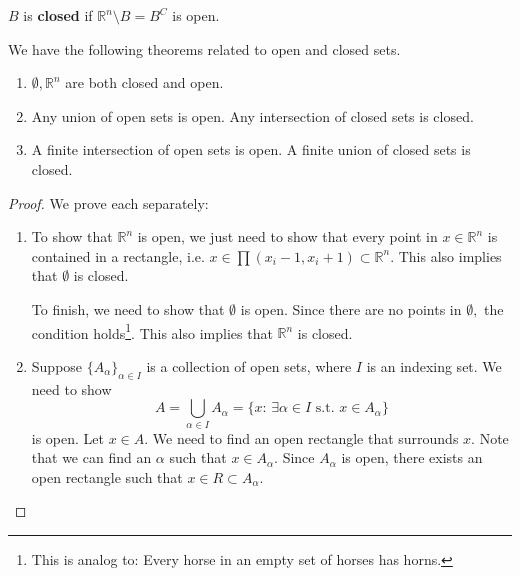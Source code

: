 \begin{itemize}
\begin{definition}
              $B$ is \textbf{closed} if $\mathbb{R}^n \setminus B = B^{C}$ is open.
          \end{definition}
          \begin{theorem}
              We have the following theorems related to open and closed sets.
              \begin{enumerate}
                  \item $\emptyset,\mathbb{R}^n$ are both closed and open.
                  \item Any union of open sets is open. Any intersection of closed sets is closed.
                  \item A finite intersection of open sets is open. A finite union of closed sets is closed.
              \end{enumerate}
          \end{theorem}
          \begin{proof}
              We prove each separately:
              \begin{enumerate}
                  \item To show that $\mathbb{R}^n$ is open, we just need to show that every point in $x\in\mathbb{R}^n$ is contained in a rectangle, i.e. $x\in \prod (x_i-1,x_i+1)\subset \mathbb{R}^n.$ This also implies that $\emptyset$ is closed.

                        To finish, we need to show that $\emptyset$ is open. Since there are no points in $\emptyset,$ the condition holds\footnote{This is analog to: Every horse in an empty set of horses has horns.}. This also implies that $\mathbb{R}^n$ is closed.
                  \item Suppose $\{A_\alpha\}_{\alpha \in I}$ is a collection of open sets, where $I$ is an indexing set. We need to show
                        \begin{equation}
                            A = \bigcup_{\alpha \in I}A_\alpha =\{x:\,\exists \alpha \in I \text{ s.t. } x\in A_\alpha\}
                        \end{equation}
                        is open. Let $x\in A$. We need to find an open rectangle that surrounds $x$. Note that we can find an $\alpha$ such that $x\in A_\alpha.$ Since $A_\alpha$ is open, there exists an open rectangle such that $x\in R \subset A_\alpha.$


\end{enumerate}
\end{proof}
\end{itemize}
